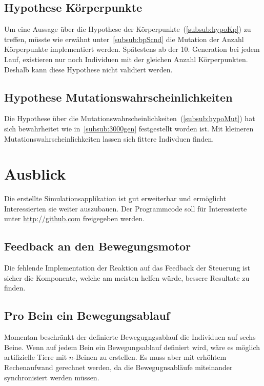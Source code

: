     \subsection{Hypothese Körperpunkte}

      Um eine Aussage über die Hypothese der Körperpunkte~(\vref{subsub:hypoKp}) zu treffen,
      müsste wie erwähnt unter~\vref{subsub:bpScnd} die Mutation der Anzahl Körperpunkte implementiert werden.
      Spätestens ab der 10. Generation bei jedem Lauf,
      existieren nur noch Individuen mit der gleichen Anzahl Körperpunkten.
      Deshalb kann diese Hypothese nicht validiert werden.


    \subsection{Hypothese Mutationswahrscheinlichkeiten}

      Die Hypothese über die Mutationswahrscheinlichkeiten~(\vref{subsub:hypoMut}) hat sich bewahrheitet
      wie in~\vref{subsub:3000gen} festgestellt worden ist.
      Mit kleineren Mutationswahrscheinlichkeiten lassen sich fittere Indivduen finden.

  \section{Ausblick\label{sec:ausblick}}


    Die erstellte Simulationsapplikation ist gut erweiterbar und ermöglicht Interessierten sie weiter auszubauen.
    Der Programmcode soll für Interessierte unter \url{http://github.com} freigegeben werden.

    \subsection{Feedback an den Bewegungsmotor\label{sub:PerspectiveFeedback}}

      Die fehlende Implementation der Reaktion auf das Feedback der Steuerung ist sicher die Komponente,
      welche am meisten helfen würde, bessere Resultate zu finden.

    \subsection{Pro Bein ein Bewegungsablauf}
      Momentan beschränkt der definierte Bewegugngsablauf die Individuen auf sechs Beine.
      Wenn auf jedem Bein ein Bewegungsablauf definiert wird, wäre es möglich artifizielle Tiere mit \(n\)-Beinen zu erstellen.
      Es muss aber mit erhöhtem Rechenaufwand gerechnet werden, da die Bewegugnsabläufe miteinander synchronisiert werden müssen.

